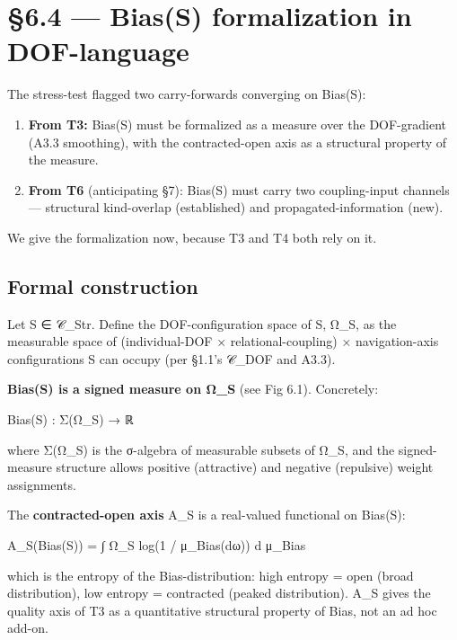 \documentclass[11pt, openany]{book}
\newcommand{\sectionbreak}{\clearpage}
\begin{document}
\sectionbreak

\section{§6.4 --- Bias(S) formalization in DOF-language}

The stress-test flagged two carry-forwards converging on Bias(S):

\begin{enumerate}
\item \textbf{From T3:} Bias(S) must be formalized as a measure over the DOF-gradient (A3.3 smoothing), with the contracted-open axis as a structural property of the measure.
\item \textbf{From T6} (anticipating §7): Bias(S) must carry two coupling-input channels --- structural kind-overlap (established) and propagated-information (new).
\end{enumerate}

We give the formalization now, because T3 and T4 both rely on it.

\subsection{Formal construction}

Let S ∈ 𝒞\_\allowbreak{}Str. Define the DOF-configuration space of S, Ω\_\allowbreak{}S, as the measurable space of (individual-DOF × relational-coupling) × navigation-axis configurations S can occupy (per §1.1's 𝒞\_\allowbreak{}DOF and A3.3).

\textbf{Bias(S) is a signed measure on Ω\_\allowbreak{}S} (see Fig 6.1). Concretely:

\begin{Code}
Bias(S) : Σ(Ω_S) → ℝ
\end{Code}

where Σ(Ω\_\allowbreak{}S) is the σ-algebra of measurable subsets of Ω\_\allowbreak{}S, and the signed-measure structure allows positive (attractive) and negative (repulsive) weight assignments.

The \textbf{contracted-open axis} A\_\allowbreak{}S is a real-valued functional on Bias(S):

\begin{Code}
A_S(Bias(S)) = ∫ Ω_S log(1 / μ_Bias(dω)) d μ_Bias
\end{Code}

which is the entropy of the Bias-distribution: high entropy = open (broad distribution), low entropy = contracted (peaked distribution). A\_\allowbreak{}S gives the quality axis of T3 as a quantitative structural property of Bias, not an ad hoc add-on.
\end{document}
